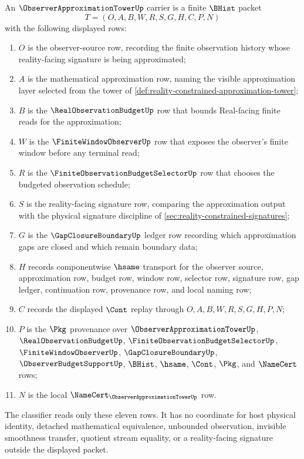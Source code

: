\begin{definition}
\label{def:observer-approximation-tower-carrier}
An $\ObserverApproximationTowerUp$ carrier is a finite $\BHist$ packet
$$
T=(O,A,B,W,R,S,G,H,C,P,N)
$$
with the following displayed rows:
\begin{enumerate}
\item $O$ is the observer-source row, recording the finite observation history whose reality-facing signature is being approximated;
\item $A$ is the mathematical approximation row, naming the visible approximation layer selected from the tower of \autoref{def:reality-constrained-approximation-tower};
\item $B$ is the $\RealObservationBudgetUp$ row that bounds Real-facing finite reads for the approximation;
\item $W$ is the $\FiniteWindowObserverUp$ row that exposes the observer's finite window before any terminal read;
\item $R$ is the $\FiniteObservationBudgetSelectorUp$ row that chooses the budgeted observation schedule;
\item $S$ is the reality-facing signature row, comparing the approximation output with the physical signature discipline of \autoref{sec:reality-constrained-signatures};
\item $G$ is the $\GapClosureBoundaryUp$ ledger row recording which approximation gaps are closed and which remain boundary data;
\item $H$ records componentwise $\hsame$ transport for the observer source, approximation row, budget row, window row, selector row, signature row, gap ledger, continuation row, provenance row, and local naming row;
\item $C$ records the displayed $\Cont$ replay through $O,A,B,W,R,S,G,H,P,N$;
\item $P$ is the $\Pkg$ provenance over $\ObserverApproximationTowerUp$, $\RealObservationBudgetUp$, $\FiniteObservationBudgetSelectorUp$, $\FiniteWindowObserverUp$, $\GapClosureBoundaryUp$, $\ObserverBudgetSupportUp$, $\BHist$, $\hsame$, $\Cont$, $\Pkg$, and $\NameCert$ rows;
\item $N$ is the local $\NameCert_{\ObserverApproximationTowerUp}$ row.
\end{enumerate}
The classifier reads only these eleven rows. It has no coordinate for host physical identity, detached mathematical equivalence, unbounded observation, invisible smoothness transfer, quotient stream equality, or a reality-facing signature outside the displayed packet.
\end{definition}

